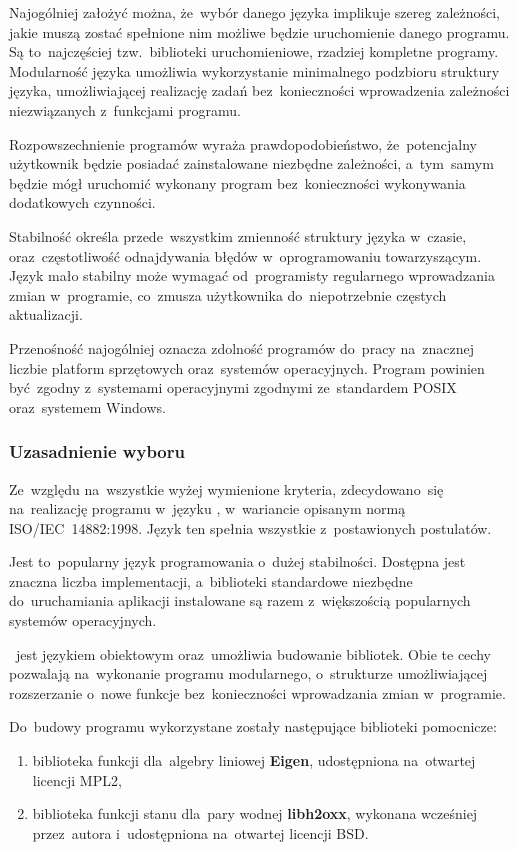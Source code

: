 Najogólniej założyć można, że~wybór danego języka implikuje szereg
zależności, jakie muszą zostać spełnione nim możliwe będzie uruchomienie
danego programu. Są to~najczęściej tzw.~biblioteki uruchomieniowe,
rzadziej kompletne programy. Modularność języka umożliwia wykorzystanie
minimalnego podzbioru struktury języka, umożliwiającej realizację zadań
bez~konieczności wprowadzenia zależności niezwiązanych z~funkcjami
programu.

Rozpowszechnienie programów wyraża prawdopodobieństwo, że~potencjalny
użytkownik będzie posiadać zainstalowane niezbędne zależności,
a~tym~samym będzie mógł uruchomić wykonany program bez~konieczności
wykonywania dodatkowych czynności.

Stabilność określa przede~wszystkim zmienność struktury języka w~czasie,
oraz~częstotliwość odnajdywania błędów w~oprogramowaniu towarzyszącym.
Język mało stabilny może wymagać od~programisty regularnego wprowadzania
zmian w~programie, co~zmusza użytkownika do~niepotrzebnie częstych
aktualizacji.

Przenośność najogólniej oznacza zdolność programów do~pracy na~znacznej
liczbie platform sprzętowych oraz~systemów operacyjnych. Program
powinien być~zgodny z~systemami operacyjnymi zgodnymi ze~standardem
POSIX oraz~systemem Windows.


\subsubsection{Uzasadnienie wyboru}

Ze~względu na~wszystkie wyżej wymienione kryteria, zdecydowano~się
na~realizację programu w~języku \Cpp, w~wariancie opisanym normą
ISO/IEC~14882:1998. Język ten spełnia wszystkie z~postawionych
postulatów.

Jest to~popularny język programowania o~dużej stabilności. Dostępna jest
znaczna liczba implementacji, a~biblioteki standardowe niezbędne
do~uruchamiania aplikacji instalowane są razem z~większością popularnych
systemów operacyjnych.

\Cpp~jest językiem obiektowym oraz~umożliwia budowanie bibliotek. Obie te
cechy pozwalają na~wykonanie programu modularnego, o~strukturze
umożliwiającej rozszerzanie o~nowe funkcje bez~konieczności wprowadzania
zmian w~programie.

Do~budowy programu wykorzystane zostały następujące biblioteki
pomocnicze:

\begin{enumerate}

	\item biblioteka funkcji dla~algebry liniowej \textbf{Eigen}, udostępniona
		na~otwartej licencji MPL2\cite{eigen},

	\item biblioteka funkcji stanu dla~pary wodnej \textbf{libh2oxx},
		wykonana wcześniej przez~autora i~udostępniona na~otwartej
		licencji BSD\cite{libh2o}.

\end{enumerate}


